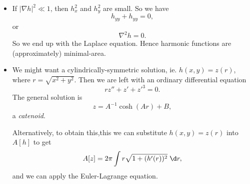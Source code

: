 \documentclass[a4paper]{article}
\begin{document}
\begin{eg}
\begin{itemize}
    \item If $|\nabla h|^2 \ll 1$, then $h_x^2$ and $h_y^2$ are small. So we have
      \[
        h_{yy} + h_{yy} = 0,
      \]
      or
      \[
        \nabla^2 h = 0.
      \]
      So we end up with the Laplace equation. Hence harmonic functions are (approximately) minimal-area.
    \item We might want a cylindrically-symmetric solution, ie. $h(x, y) = z(r)$, where $r = \sqrt{x^2 + y^2}$. Then we are left with an ordinary differential equation
      \[
        rz'' + z' + z'^3 = 0.
      \]
      The general solution is
      \[
        z = A^{-1}\cosh (Ar) + B,
      \]
      a \emph{catenoid}.

      Alternatively, to obtain this,this we can substitute $h(x, y) = z(r)$ into $A[h]$ to get
      \[
        A[z] = 2\pi \int r\sqrt{1 + (h'(r))^2}\;\d r,
      \]
      and we can apply the Euler-Lagrange equation.
  \end{itemize}
\end{eg}
\end{document}
